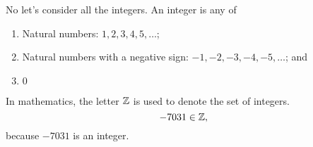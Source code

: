\begin{example}
  No let's consider all the integers. An integer is any of
  \begin{enumerate}[label=\arabic*),noitemsep]
  \item Natural numbers: \(1,2,3,4,5,\dotsc\);
  \item Natural numbers with a negative sign: \(-1,-2,-3,-4,-5,\dotsc\);
    and
  \item \(0\)
  \end{enumerate}
\end{example}

In mathematics, the letter \(\mathbb{Z}\) is used to denote the set of integers.
\[
  -7031\in\mathbb{Z},
\]
because \(-7031\) is an integer.

